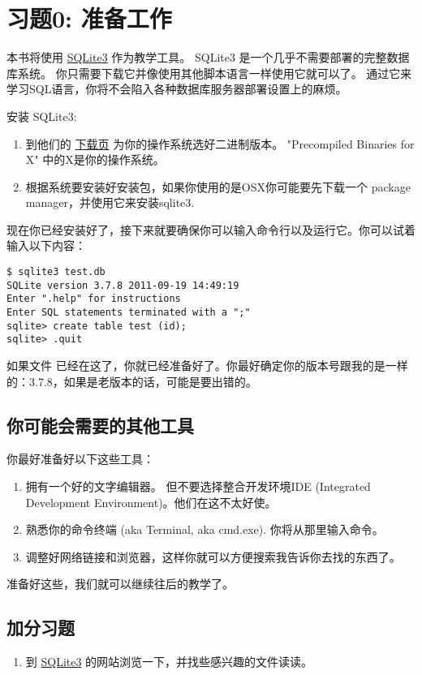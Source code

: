 \chapter{习题0: 准备工作}

本书将使用 \href{http://www.sqlite.org/download.html}{SQLite3} 作为教学工具。 SQLite3 是一个几乎不需要部署的完整数据库系统。 你只需要下载它并像使用其他脚本语言一样使用它就可以了。 通过它来学习SQL语言，你将不会陷入各种数据库服务器部署设置上的麻烦。

安装 SQLite3:

\begin{enumerate}
\item 到他们的 \href{http://www.sqlite.org/download.html}{下载页} 为你的操作系统选好二进制版本。 "Precompiled Binaries for X" 中的X是你的操作系统。
\item 根据系统要安装好安装包，如果你使用的是OSX你可能要先下载一个 package manager，并使用它来安装sqlite3.
\end{enumerate}

现在你已经安装好了，接下来就要确保你可以输入命令行以及运行它。你可以试着输入以下内容：

\begin{lstlisting}
$ sqlite3 test.db
SQLite version 3.7.8 2011-09-19 14:49:19
Enter ".help" for instructions
Enter SQL statements terminated with a ";"
sqlite> create table test (id);
sqlite> .quit
\end{lstlisting}

如果文件  已经在这了，你就已经准备好了。你最好确定你的版本号跟我的是一样的：3.7.8，如果是老版本的话，可能是要出错的。

\section{你可能会需要的其他工具}

你最好准备好以下这些工具：

\begin{enumerate}
\item 拥有一个好的文字编辑器。 但不要选择整合开发环境IDE (Integrated Development Environment)。他们在这不太好使。
\item 熟悉你的命令终端 (aka Terminal, aka cmd.exe). 你将从那里输入命令。
\item 调整好网络链接和浏览器，这样你就可以方便搜索我告诉你去找的东西了。
\end{enumerate}

准备好这些，我们就可以继续往后的教学了。

\section{加分习题}

\begin{enumerate}
\item 到 \href{http://www.sqlite.org/download.html}{SQLite3} 的网站浏览一下，并找些感兴趣的文件读读。
\end{enumerate}


